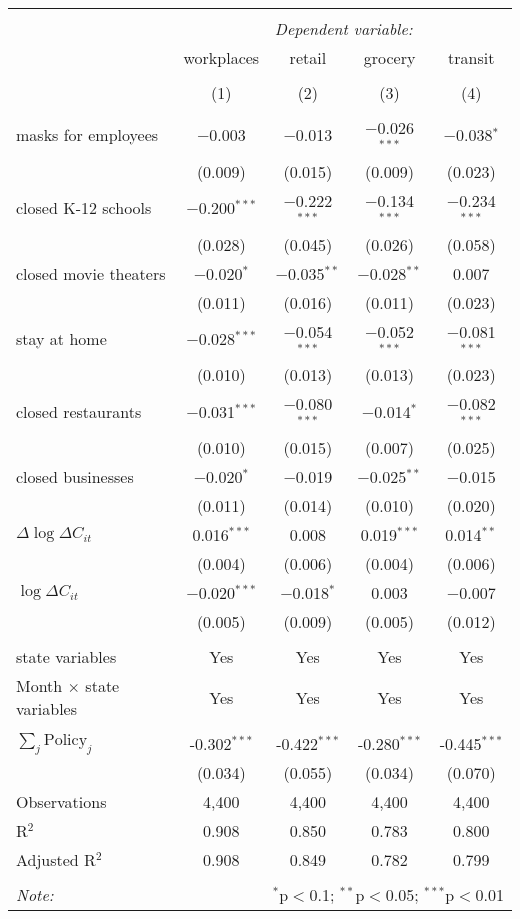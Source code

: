 \begin{tabular}{@{\extracolsep{1pt}}lcccc} 
\\[-1.8ex]\hline 
\hline \\[-1.8ex] 
 & \multicolumn{4}{c}{\textit{Dependent variable:}} \\ 
\cline{2-5} 
 & workplaces & retail & grocery & transit \\ 
\\[-1.8ex] & (1) & (2) & (3) & (4)\\ 
\hline \\[-1.8ex] 
 masks for employees & $-$0.003 & $-$0.013 & $-$0.026$^{***}$ & $-$0.038$^{*}$ \\ 
  & (0.009) & (0.015) & (0.009) & (0.023) \\ 
  closed K-12 schools & $-$0.200$^{***}$ & $-$0.222$^{***}$ & $-$0.134$^{***}$ & $-$0.234$^{***}$ \\ 
  & (0.028) & (0.045) & (0.026) & (0.058) \\ 
  closed movie theaters & $-$0.020$^{*}$ & $-$0.035$^{**}$ & $-$0.028$^{**}$ & 0.007 \\ 
  & (0.011) & (0.016) & (0.011) & (0.023) \\ 
  stay at home & $-$0.028$^{***}$ & $-$0.054$^{***}$ & $-$0.052$^{***}$ & $-$0.081$^{***}$ \\ 
  & (0.010) & (0.013) & (0.013) & (0.023) \\ 
  closed restaurants & $-$0.031$^{***}$ & $-$0.080$^{***}$ & $-$0.014$^{*}$ & $-$0.082$^{***}$ \\ 
  & (0.010) & (0.015) & (0.007) & (0.025) \\ 
  closed businesses & $-$0.020$^{*}$ & $-$0.019 & $-$0.025$^{**}$ & $-$0.015 \\ 
  & (0.011) & (0.014) & (0.010) & (0.020) \\ 
  $\Delta \log \Delta C_{it}$ & 0.016$^{***}$ & 0.008 & 0.019$^{***}$ & 0.014$^{**}$ \\ 
  & (0.004) & (0.006) & (0.004) & (0.006) \\ 
  $\log \Delta C_{it}$ & $-$0.020$^{***}$ & $-$0.018$^{*}$ & 0.003 & $-$0.007 \\ 
  & (0.005) & (0.009) & (0.005) & (0.012) \\ 
 \hline \\[-1.8ex] 
state variables & Yes & Yes & Yes & Yes \\ 
Month $\times$ state variables & Yes & Yes & Yes & Yes \\ 
\hline \\[-1.8ex] 
$\sum_j \mathrm{Policy}_j$ & -0.302$^{***}$ & -0.422$^{***}$ & -0.280$^{***}$ & -0.445$^{***}$ \\ 
 & (0.034) & (0.055) & (0.034) & (0.070) \\ 
Observations & 4,400 & 4,400 & 4,400 & 4,400 \\ 
R$^{2}$ & 0.908 & 0.850 & 0.783 & 0.800 \\ 
Adjusted R$^{2}$ & 0.908 & 0.849 & 0.782 & 0.799 \\ 
\hline 
\hline \\[-1.8ex] 
\textit{Note:}  & \multicolumn{4}{r}{$^{*}$p$<$0.1; $^{**}$p$<$0.05; $^{***}$p$<$0.01} \\ 
\end{tabular} 